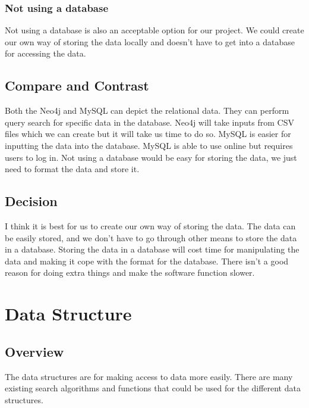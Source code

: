 \documentclass[onecolumn, draftclsnofoot, 10pt, compsoc]{IEEEtran}
\begin{document}
\subsubsection{Not using a database}
\begin{singlespace}
Not using a database is also an acceptable option for our project. We could create our own way of storing the data locally and doesn't have to get into a database for accessing the data. 
\end{singlespace}

\subsection{Compare and Contrast}
\begin{singlespace}
Both the Neo4j and MySQL can depict the relational data. They can perform query search for specific data in the database. Neo4j will take inputs from CSV files which we can create but it will take us time to do so. MySQL is easier for inputting the data into the database. MySQL is able to use online but requires users to log in. Not using a database would be easy for storing the data, we just need to format the data and store it.
\end{singlespace}

\subsection{Decision}
\begin{singlespace}
I think it is best for us to create our own way of storing the data. The data can be easily stored, and we don't have to go through other means to store the data in a database. Storing the data in a database will cost time for manipulating the data and making it cope with the format for the database. There isn't a good reason for doing extra things and make the software function slower.  
\end{singlespace}


\section{Data Structure}
\subsection{Overview}
\begin{singlespace}
The data structures are for making access to data more easily. There are many existing search algorithms and functions that could be used for the different data structures. 
\end{singlespace}
\end{document}

